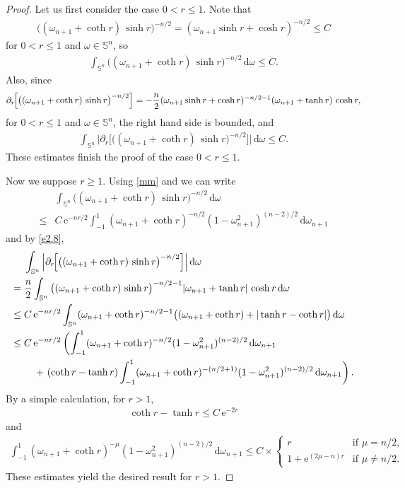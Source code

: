 \documentclass[a4paper,12pt]{amsart}
\numberwithin{equation}{section}
\theoremstyle{definition}
\theoremstyle{remark}
\numberwithin{theorem}{section}
\newcommand{\e}{\mathrm{e}}
\renewcommand{\SS}{\mathbb{S}}
\renewcommand{\d}{\mathrm{d}}
\begin{document}
\begin{proof}
Let us first consider the case $0<r\leq 1$. Note that
\begin{align*}
\big((\omega_{n+1}+\coth r)\,\sinh r\big)^{-n/2}=(\omega_{n+1}\sinh r+\cosh r)^{-n/2}\leq C
\end{align*}
for $0<r\leq 1$ and $\omega\in\SS^n$, so
\begin{align*}
\int_{\SS^n}\big((\omega_{n+1}+\coth r)\, \sinh r \big)^{-n/2}\,\d\omega\leq C.
\end{align*}
Also, since
\begin{align}\label{e2.8}
\partial_r\!\Big[\big((\omega_{n+1}+\coth r)\, \sinh r\big)^{-n/2}\Big]=-{n\over 2}(\omega_{n+1}\sinh r+\cosh r)^{-n/2-1}(\omega_{n+1}+\tanh r)\,\cosh r,
\end{align}
for $0<r\leq 1$ and $\omega\in \SS^n$, the right hand side is bounded, and
\begin{align*}
\int_{\SS^n}\Big|\partial_r\!\Big[\big((\omega_{n+1}+\coth r)\, \sinh r \big)^{-n/2}\Big]\Big|\,\d\omega\leq C.
\end{align*}
These estimates finish the proof of the case $0<r\leq 1$.

Now we suppose $r\geq 1$. Using \eqref{mm} and \cite[\S D.2]{Gr2} we can write
\begin{align*}
{}&\int_{\SS^n}\big((\omega_{n+1}+\coth r)\,\sinh r\big)^{-n/2}\,\d\omega\\
\leq{}&C\,\e^{-nr/2}\int_{-1}^1(\omega_{n+1}+\coth r)^{-n/2}(1-\omega_{n+1}^2)^{(n-2)/2}\,\d\omega_{n+1}
\end{align*}
and by \eqref{e2.8},
\begin{align*}
&\int_{\SS^n}\Big|\partial_r\!\Big[\big((\omega_{n+1}+\coth r)\, \sinh r \big)^{-n/2}\Big]\Big|\,\d\omega\\
={}&{n\over 2}\int_{\SS^n}\big((\omega_{n+1}+\coth r)\, \sinh r\big)^{-n/2-1}|\omega_{n+1}+\tanh r|\,\cosh r\,\d\omega\\
\leq{}&C\,\e^{-nr/2}\int_{\SS^n}(\omega_{n+1}+\coth r)^{-n/2-1}\big((\omega_{n+1}+\coth r)+|\tanh r-\coth r|\big)\,\d \omega\\
\leq{}&C\,\e^{-nr/2}\left(\int_{-1}^1(\omega_{n+1}+\coth r)^{-n/2}(1-\omega_{n+1}^2)^{(n-2)/2}\,\d\omega_{n+1}\right.\\
{}&\quad+\left.(\coth r-\tanh r)\int_{-1}^1(\omega_{n+1}+\coth r)^{-(n/2+1)}(1-\omega_{n+1}^2)^{(n-2)/2}\,\d\omega_{n+1}\right).
\end{align*}
By a simple calculation, for $r>1$,
\begin{align*}
\coth r-\tanh r\leq C\, \e^{-2r} 
\end{align*}
and 
\begin{align*}
\int_{-1}^1(\omega_{n+1}+\coth r)^{-\mu}(1-\omega_{n+1}^2)^{(n-2)/2}\,\d\omega_{n+1}\leq C\times \begin{cases}
r&\mbox{if }\mu=n/2,\\[3pt]
1+\e^{(2\mu-n)r}&\mbox{if }\mu\ne n/2.
\end{cases}
\end{align*}
These estimates yield the desired result for $r>1$.
\end{proof}
\end{document}
